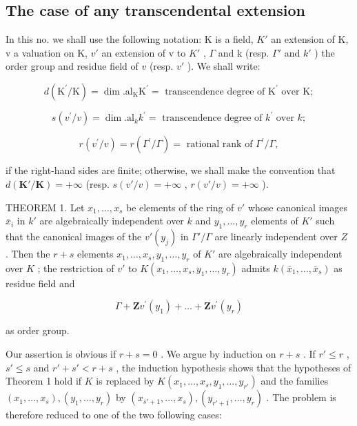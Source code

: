 \subsection{The case of any transcendental extension}

In this no. we shall use the following notation: K is a field, \(K'\) an extension of K, v a valuation on K, \(v'\) an extension of v to \(K'\) , \(\Gamma\) and k (resp. \(\Gamma'\) and \(k'\) ) the order group and residue field of \(v\) (resp. \(v'\) ). We shall write:

\[
d \left(\mathrm{K} ^ {\prime} / \mathrm{K}\right) = \dim . \mathrm{al} _ {\mathrm{K}} \mathrm{K} ^ {\prime} = \text { transcendence   degree   of } \mathrm{K} ^ {\prime} \text { over } \mathrm{K};
\]

\[
s (v ^ {\prime} / v) = \dim . \mathrm{al} _ {k} k ^ {\prime} = \text { transcendence   degree   of } k ^ {\prime} \text { over } k;
\]

\[
r (v ^ {\prime} / v) = r (\Gamma^ {\prime} / \Gamma) = \text { rational   rank   of } \Gamma^ {\prime} / \Gamma ,
\]

if the right-hand sides are finite; otherwise, we shall make the convention that \(d(\mathbf{K}' / \mathbf{K}) = +\infty\) (resp. \(s(v' / v) = +\infty\) , \(r(v' / v) = +\infty\) ).

THEOREM 1. Let \(x_1, \ldots, x_s\) be elements of the ring of \(v'\) whose canonical images \(\bar{x}_i\) in \(k'\) are algebraically independent over \(k\) and \(y_1, \ldots, y_r\) elements of \(K'\) such that the canonical images of the \(v'(y_j)\) in \(\Gamma'/\Gamma\) are linearly independent over \(Z\) . Then the \(r + s\) elements \(x_1, \ldots, x_s, y_1, \ldots, y_r\) of \(K'\) are algebraically independent over \(K\) ; the restriction of \(v'\) to \(K(x_1, \ldots, x_s, y_1, \ldots, y_r)\) admits \(k(\bar{x}_1, \ldots, \bar{x}_s)\) as residue field and

\[
\Gamma + \mathbf {Z} v ^ {\prime} (y _ {1}) + \dots + \mathbf {Z} v ^ {\prime} (y _ {r})
\]

as order group.

Our assertion is obvious if \(r + s = 0\) . We argue by induction on \(r + s\) . If \(r' \leqslant r\) , \(s' \leqslant s\) and \(r' + s' < r + s\) , the induction hypothesis shows that the hypotheses of Theorem 1 hold if \(K\) is replaced by \(K(x_1, \ldots, x_s, y_1, \ldots, y_{r'})\) and the families \((x_1, \ldots, x_s), (y_1, \ldots, y_r)\) by \((x_{s'+1}, \ldots, x_s), (y_{r'+1}, \ldots, y_r)\) . The problem is therefore reduced to one of the two following cases:


